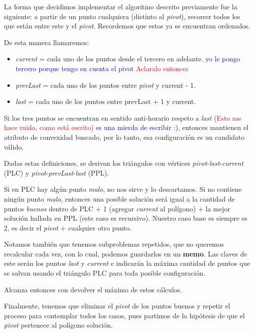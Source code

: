 La forma que decidimos implementar el algoritmo descrito previamente fue la siguiente: a partir de un punto cualquiera (distinto al \textit{pivot}), recorrer todos los que están entre este y el \textit{pivot}. Recordemos que estos ya se encuentran ordenados.

De esta manera llamaremos:
\begin{itemize}
  \item \textit{current} = cada uno de los puntos desde el tercero en adelante. \textcolor{blue}{yo le pongo tercero porque tengo en cuenta el pivot} \textcolor{red}{Aclaralo entonces}

  \item \textit{prevLast} = cada uno de los puntos entre \textit{pivot} y current - 1.

  \item \textit{last} = cada uno de los puntos entre prevLast + 1 y current.
\end{itemize}

Si los tres puntos se encuentran en sentido anti-horario respeto a \textit{last} \textcolor{red}{(Esto me hace ruido, como está escrito)} \textcolor{blue}{es una mierda de escribir :)}, entonces mantienen el atributo de convexidad buscado, por lo tanto, esa configuración es un candidato válido.

Dadas estas definiciones, se derivan los triángulos con vértices \textit{pivot}-\textit{last}-\textit{current} (PLC) y \textit{pivot}-\textit{prevLast}-\textit{last} (PPL).

Si en PLC hay algún punto \textit{malo}, no nos sirve y lo descartamos. Si no contiene ningún punto \textit{malo}, entonces una posible solución será igual a la cantidad de puntos \textit{buenos} dentro de PLC + 1 (agregar \textit{current} al polígono) + la mejor solución hallada en PPL (este caso es recursivo). Nuestro caso base es siempre es 2, es decir el \textit{pivot} + cualquier otro punto.

Notamos también que tenemos subproblemas repetidos, que no queremos recalcular cada vez, con lo cual, podemos guardarlos en un \textbf{memo}. Las claves de este serán los puntos \textit{last} y \textit{current} e indicarán la máxima cantidad de puntos que se salvan usando el triángulo PLC para toda posible configuración.

Alcanza entonces con devolver el máximo de estos cálculos.

Finalmente, tenemos que eliminar el \textit{pivot} de los puntos buenos y repetir el proceso para contemplar todos los casos, pues partimos de la hipótesis de que el \textit{pivot} pertenece al polígono solución.

